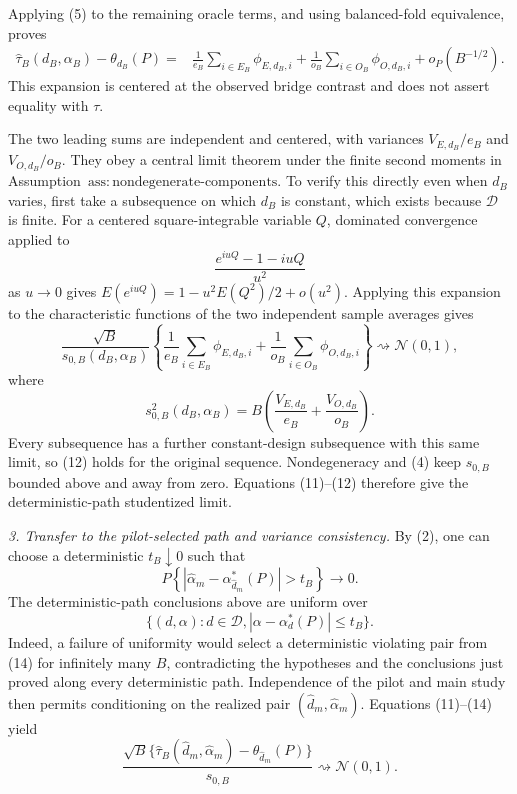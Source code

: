 Applying (5) to the remaining oracle terms, and using balanced-fold equivalence, proves
\[
\begin{aligned}
 \widehat\tau_B(d_B,\alpha_B)-\theta_{d_B}(P)
 ={}&\frac1{e_B}\sum_{i\in E_B}\phi_{E,d_B,i}
 +\frac1{o_B}\sum_{i\in O_B}\phi_{O,d_B,i}
 +o_P(B^{-1/2}).
\end{aligned} \tag{11}
\]
This expansion is centered at the observed bridge contrast and does not assert equality with \(\tau\).

The two leading sums are independent and centered, with variances \(V_{E,d_B}/e_B\) and \(V_{O,d_B}/o_B\).  They obey a central limit theorem under the finite second moments in Assumption~\(\mathrm{ass{:}nondegenerate\text{-}components}\).  To verify this directly even when \(d_B\) varies, first take a subsequence on which \(d_B\) is constant, which exists because \(\mathcal D\) is finite.  For a centered square-integrable variable \(Q\), dominated convergence applied to
\[
 \frac{e^{iuQ}-1-iuQ}{u^2}
\]
as \(u\to0\) gives \(E(e^{iuQ})=1-u^2E(Q^2)/2+o(u^2)\).  Applying this expansion to the characteristic functions of the two independent sample averages gives
\[
 \frac{\sqrt B}{s_{0,B}(d_B,\alpha_B)}
 \left\{
 \frac1{e_B}\sum_{i\in E_B}\phi_{E,d_B,i}
 +\frac1{o_B}\sum_{i\in O_B}\phi_{O,d_B,i}
 \right\}
 \rightsquigarrow\mathcal N(0,1), \tag{12}
\]
where
\[
 s_{0,B}^2(d_B,\alpha_B)
 =B\left(\frac{V_{E,d_B}}{e_B}+\frac{V_{O,d_B}}{o_B}\right).
\]
Every subsequence has a further constant-design subsequence with this same limit, so (12) holds for the original sequence.  Nondegeneracy and (4) keep \(s_{0,B}\) bounded above and away from zero.  Equations (11)--(12) therefore give the deterministic-path studentized limit.

\emph{3. Transfer to the pilot-selected path and variance consistency.}
By (2), one can choose a deterministic \(t_B\downarrow0\) such that
\[
 P\left\{
 |\widehat\alpha_m-\alpha_{\widehat d_m}^*(P)|>t_B
 \right\}\longrightarrow0. \tag{13}
\]
The deterministic-path conclusions above are uniform over
\[
 \{(d,\alpha):d\in\mathcal D,
 |\alpha-\alpha_d^*(P)|\le t_B\}. \tag{14}
\]
Indeed, a failure of uniformity would select a deterministic violating pair from (14) for infinitely many \(B\), contradicting the hypotheses and the conclusions just proved along every deterministic path.  Independence of the pilot and main study then permits conditioning on the realized pair \((\widehat d_m,\widehat\alpha_m)\).  Equations (11)--(14) yield
\[
 \frac{\sqrt B\{\widehat\tau_B(\widehat d_m,\widehat\alpha_m)
 -\theta_{\widehat d_m}(P)\}}{s_{0,B}}
 \rightsquigarrow\mathcal N(0,1). \tag{15}
\]

